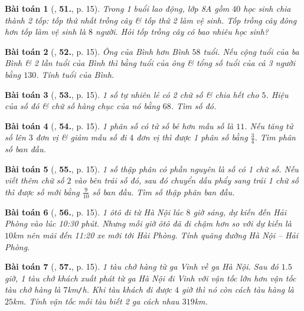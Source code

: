 \documentclass{article}
\numberwithin{equation}{section}
\newtheorem{baitoan}{Bài toán}
\begin{document}
\begin{baitoan}[\cite{SBT_Toan_8_tap_2}, \textbf{51.}, p. 15]
	Trong 1 buổi lao động, lớp 8A gồm $40$ học sinh chia thành 2 tốp: tốp thứ nhất trồng cây \& tốp thứ 2 làm vệ sinh. Tốp trồng cây đông hơn tốp làm vệ sinh là $8$ người. Hỏi tốp trồng cây có bao nhiêu học sinh?	
\end{baitoan}

\begin{baitoan}[\cite{SBT_Toan_8_tap_2}, \textbf{52.}, p. 15]
	Ông của Bình hơn Bình $58$ tuổi. Nếu cộng tuổi của ba Bình \& 2 lần tuổi của Bình thì bằng tuổi của ông \& tổng số tuổi của cả 3 người bằng $130$. Tính tuổi của Bình.	
\end{baitoan}

\begin{baitoan}[\cite{SBT_Toan_8_tap_2}, \textbf{53.}, p. 15]
	1 số tự nhiên lẻ có 2 chữ số \& chia hết cho $5$. Hiệu của số đó \& chữ số hàng chục của nó bằng $68$. Tìm số đó.
\end{baitoan}

\begin{baitoan}[\cite{SBT_Toan_8_tap_2}, \textbf{54.}, p. 15]
	1 phân số có tử số bé hơn mẫu số là $11$. Nếu tăng tử số lên $3$ đơn vị \& giảm mẫu số đi $4$ đơn vị thì được 1 phân số bằng $\frac{3}{4}$. Tìm phân số ban đầu.
\end{baitoan}

\begin{baitoan}[\cite{SBT_Toan_8_tap_2}, \textbf{55.}, p. 15]
	1 số thập phân có phần nguyên là số có 1 chữ số. Nếu viết thêm chữ số $2$ vào bên trái số đó, sau đó chuyển dấu phẩy sang trái 1 chữ số thì được số mới bằng $\frac{9}{10}$ số ban đầu. Tìm số thập phân ban đầu.
\end{baitoan}

\begin{baitoan}[\cite{SBT_Toan_8_tap_2}, \textbf{56.}, p. 15]
	1 ôtô đi từ Hà Nội lúc $8$ giờ sáng, dự kiến đến Hải Phòng vào lúc 10:30 phút. Nhưng mỗi giờ ôtô đã đi chậm hơn so với dự kiến là $10$\emph{km} nên mãi đến 11:20 xe mới tới Hải Phòng. Tính quãng đường Hà Nội -- Hải Phòng.
\end{baitoan}

\begin{baitoan}[\cite{SBT_Toan_8_tap_2}, \textbf{57.}, p. 15]
	1 tàu chở hàng từ ga Vinh về ga Hà Nội. Sau đó $1.5$ giờ, 1 tàu chở khách xuất phát từ ga Hà Nội đi Vinh với vận tốc lớn hơn vận tốc tàu chở hàng là $7$\emph{km\texttt{/}h}. Khi tàu khách đi được $4$ giờ thì nó còn cách tàu hàng là $25$\emph{km}. Tính vận tốc mỗi tàu biết 2 ga cách nhau $319$\emph{km}.
\end{baitoan}
\end{document}
